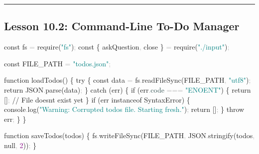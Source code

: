\documentclass[
  justified,
  openright,
]{tufte-book}
\newcommand{\AttributeTok}[1]{\textcolor{DarkSlateGray}{#1}}
\newcommand{\BuiltInTok}[1]{#1}
\newcommand{\CommentTok}[1]{\textcolor{MidGray}{#1}}
\newcommand{\ControlFlowTok}[1]{\textcolor{BrandBlue}{#1}}
\newcommand{\DecValTok}[1]{\textcolor{Purple}{#1}}
\newcommand{\FunctionTok}[1]{\textcolor{BrandBlue}{#1}}
\newcommand{\KeywordTok}[1]{\textcolor{BrandBlue}{#1}}
\newcommand{\NormalTok}[1]{#1}
\newcommand{\OperatorTok}[1]{\textcolor{DarkGray}{#1}}
\newcommand{\PreprocessorTok}[1]{\textcolor{BrandAccent}{#1}}
\newcommand{\StringTok}[1]{\textcolor{Teal}{#1}}
\newenvironment{Shaded}{%
  \begin{snugshade}
}{%
  \end{snugshade}
}
\begin{document}
\begin{center}\rule{0.5\linewidth}{0.5pt}\end{center}

\subsection{Lesson 10.2: Command-Line To-Do
Manager}\label{lesson-10.2-command-line-to-do-manager}

\begin{Shaded}
\begin{Highlighting}[]
\KeywordTok{const}\NormalTok{ fs }\OperatorTok{=} \PreprocessorTok{require}\NormalTok{(}\StringTok{"fs"}\NormalTok{)}\OperatorTok{;}
\KeywordTok{const}\NormalTok{ \{ askQuestion}\OperatorTok{,}\NormalTok{ close \} }\OperatorTok{=} \PreprocessorTok{require}\NormalTok{(}\StringTok{"./input"}\NormalTok{)}\OperatorTok{;}

\KeywordTok{const}\NormalTok{ FILE\_PATH }\OperatorTok{=} \StringTok{"todos.json"}\OperatorTok{;}

\KeywordTok{function} \FunctionTok{loadTodos}\NormalTok{() \{}
  \ControlFlowTok{try}\NormalTok{ \{}
    \KeywordTok{const}\NormalTok{ data }\OperatorTok{=}\NormalTok{ fs}\OperatorTok{.}\FunctionTok{readFileSync}\NormalTok{(FILE\_PATH}\OperatorTok{,} \StringTok{"utf8"}\NormalTok{)}\OperatorTok{;}
    \ControlFlowTok{return} \BuiltInTok{JSON}\OperatorTok{.}\FunctionTok{parse}\NormalTok{(data)}\OperatorTok{;}
\NormalTok{  \} }\ControlFlowTok{catch}\NormalTok{ (err) \{}
    \ControlFlowTok{if}\NormalTok{ (err}\OperatorTok{.}\AttributeTok{code} \OperatorTok{===} \StringTok{"ENOENT"}\NormalTok{) \{}
      \ControlFlowTok{return}\NormalTok{ []}\OperatorTok{;} \CommentTok{// File doesn\textquotesingle{}t exist yet}
\NormalTok{    \}}
    \ControlFlowTok{if}\NormalTok{ (err }\KeywordTok{instanceof} \BuiltInTok{SyntaxError}\NormalTok{) \{}
      \BuiltInTok{console}\OperatorTok{.}\FunctionTok{log}\NormalTok{(}\StringTok{"Warning: Corrupted todos file. Starting fresh."}\NormalTok{)}\OperatorTok{;}
      \ControlFlowTok{return}\NormalTok{ []}\OperatorTok{;}
\NormalTok{    \}}
    \ControlFlowTok{throw}\NormalTok{ err}\OperatorTok{;}
\NormalTok{  \}}
\NormalTok{\}}

\KeywordTok{function} \FunctionTok{saveTodos}\NormalTok{(todos) \{}
\NormalTok{  fs}\OperatorTok{.}\FunctionTok{writeFileSync}\NormalTok{(FILE\_PATH}\OperatorTok{,} \BuiltInTok{JSON}\OperatorTok{.}\FunctionTok{stringify}\NormalTok{(todos}\OperatorTok{,} \KeywordTok{null}\OperatorTok{,} \DecValTok{2}\NormalTok{))}\OperatorTok{;}
\NormalTok{\}}


\end{Highlighting}
\end{Shaded}
\end{document}
